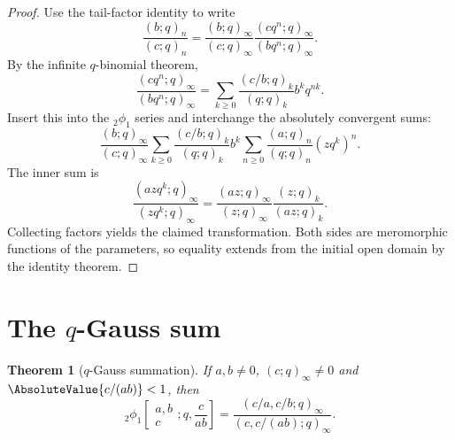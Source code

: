 \documentclass[11pt,a4paper,oneside,openany]{book}
\newtheorem{theorem}{Theorem}[chapter]
\theoremstyle{definition}
\theoremstyle{remark}
\begin{document}
\begin{proof}
Use the tail-factor identity to write
\[
 \frac{(b;q)_n}{(c;q)_n}
 =\frac{(b;q)_\infty}{(c;q)_\infty}
 \frac{(cq^n;q)_\infty}{(bq^n;q)_\infty}.
\]
By the infinite $q$-binomial theorem,
\[
 \frac{(cq^n;q)_\infty}{(bq^n;q)_\infty}
 =\sum_{k\ge0}\frac{(c/b;q)_k}{(q;q)_k}b^kq^{nk}.
\]
Insert this into the ${}_2\phi_1$ series and interchange the absolutely convergent sums:
\[
 \frac{(b;q)_\infty}{(c;q)_\infty}
 \sum_{k\ge0}\frac{(c/b;q)_k}{(q;q)_k}b^k
 \sum_{n\ge0}\frac{(a;q)_n}{(q;q)_n}(zq^k)^n.
\]
The inner sum is
\[
 \frac{(azq^k;q)_\infty}{(zq^k;q)_\infty}
 =\frac{(az;q)_\infty}{(z;q)_\infty}
 \frac{(z;q)_k}{(az;q)_k}.
\]
Collecting factors yields the claimed transformation.  Both sides are meromorphic functions of the parameters, so equality extends from the initial open domain by the identity theorem.
\end{proof}

\section{The \texorpdfstring{$q$}{q}-Gauss sum}

\begin{theorem}[$q$-Gauss summation]\label{thm:q-gauss}
If $a,b\ne0$, $(c;q)_\infty\ne0$ and $\AbsoluteValue{c/(ab)}<1$, then
\[
 {}_2\phi_1\!\left[
 \begin{matrix}a,b\\c\end{matrix};q,\frac{c}{ab}\right]
 =\frac{(c/a,c/b;q)_\infty}{(c,c/(ab);q)_\infty}.
\]
\end{theorem}
\end{document}

